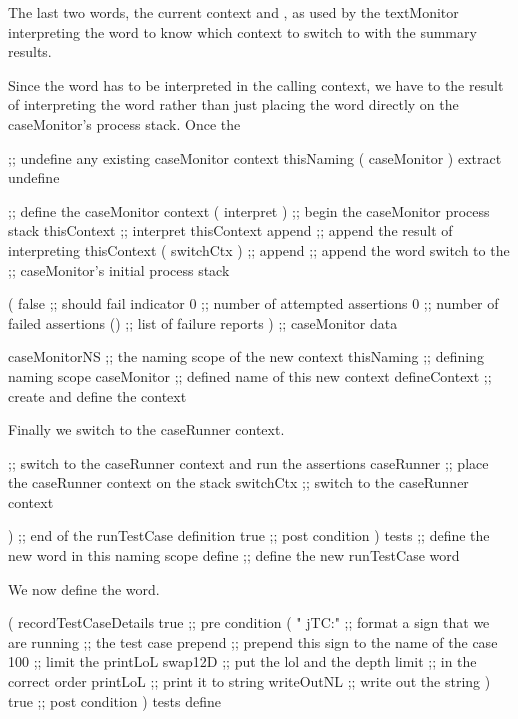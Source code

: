 The last two words, the current context and , as used by the 
textMonitor interpreting the  word to know which context to 
switch to with the summary results. 

Since the  word has to be interpreted in the calling 
context, we have to  the result of interpreting the 
 word rather than just placing the  
word directly on the caseMonitor's process stack. Once the 

\startJoylolCode
    ;; undefine any existing caseMonitor context
    thisNaming
    ( caseMonitor ) extract
    undefine

    ;; define the caseMonitor context
    ( interpret ) ;; begin the caseMonitor process stack
    thisContext   ;; interpret thisContext 
    append        ;; append the result of interpreting thisContext
    ( switchCtx ) ;; 
    append        ;; append the word switch to the
                  ;; caseMonitor's initial process stack
  
    ( 
      false       ;; should fail indicator
      0           ;; number of attempted assertions
      0           ;; number of failed assertions
      ()          ;; list of failure reports
    )             ;; caseMonitor data

    caseMonitorNS ;; the naming scope of the new context
    thisNaming    ;; defining naming scope
    caseMonitor   ;; defined name of this new context
    defineContext ;; create and define the context
\stopJoylolCode

Finally we switch to the caseRunner context.

\startJoylolCode
    ;; switch to the caseRunner context and run the assertions
    caseRunner    ;; place the caseRunner context on the stack
    switchCtx     ;; switch to the caseRunner context
  
  )               ;; end of the runTestCase definition
  { true }        ;; post condition
)
tests             ;; define the new word in this naming scope
define            ;; define the new runTestCase word
\stopJoylolCode

We now define the  word.

\startJoylolCode
(
  recordTestCaseDetails
  { true }      ;; pre condition
  (
    "  jTC:"    ;; format a sign that we are running
                ;; the test case
    prepend     ;; prepend this sign to the name of the case
    100         ;; limit the printLoL
    swap12D     ;; put the lol and the depth limit
                ;; in the correct order
    printLoL    ;; print it to string
    writeOutNL  ;; write out the string
  )
  { true }      ;; post condition
)
tests
define
\stopJoylolCode
\stopTestSuite

